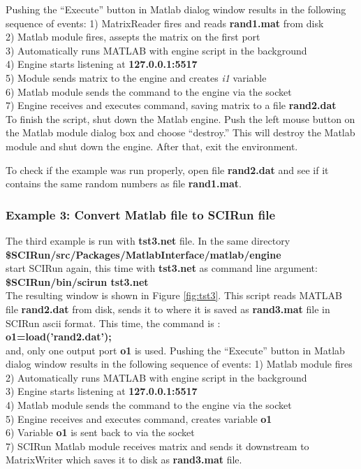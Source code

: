 Pushing the
``Execute'' button in Matlab dialog window results in
the following sequence of events:
1) MatrixReader fires and reads {\bf rand1.mat} from disk \\
2) Matlab module fires, assepts the matrix on the first port \\
3) Automatically runs MATLAB with engine script in the background  \\
4) Engine starts listening at {\bf 127.0.0.1:5517} \\
5) Module sends matrix to the engine and creates {\it i1} variable\\
6) Matlab module sends the command to the engine via the socket\\
7) Engine receives and executes command, saving matrix to a file {\bf rand2.dat} \\

To finish the script, shut down the Matlab engine.
Push the left mouse button on the
Matlab module dialog box and choose ``destroy.'' This will destroy
the Matlab module and shut down the engine. After that, exit
the \sr{} environment.

To check if the example was run properly, open file {\bf rand2.dat}
and see if it contains the same random numbers as file {\bf rand1.mat}.

\subsubsection{Example 3: Convert Matlab file to SCIRun file} \indent

The third example is run with {\bf tst3.net} file. In the same
directory \\
{\bf \$SCIRun/src/Packages/MatlabInterface/matlab/engine } \\
start SCIRun again, this time with {\bf tst3.net} as command line argument: \\
{\bf \$SCIRun/bin/scirun  tst3.net} \\
The resulting window is shown in Figure \ref{fig:tst3}. This
script reads MATLAB file {\bf rand2.dat} from disk, sends
it to \sr{} where it is saved as {\bf rand3.mat} file
in SCIRun ascii format. This time, the command is : \\
{\bf o1=load('rand2.dat');} \\
and, only one output port {\bf o1} is used. Pushing the
``Execute'' button in Matlab dialog window results in
the following sequence of events:
1) Matlab module fires \\
2) Automatically runs MATLAB with engine script in the background  \\
3) Engine starts listening at {\bf 127.0.0.1:5517} \\
4) Matlab module sends the command to the engine via the socket\\
5) Engine receives and executes command, creates variable {\bf o1} \\
6) Variable {\bf o1} is sent back to \sr{} via the socket \\
7) SCIRun Matlab module receives matrix and sends it downstream
   to MatrixWriter which saves it to disk as {\bf rand3.mat} file. \\

